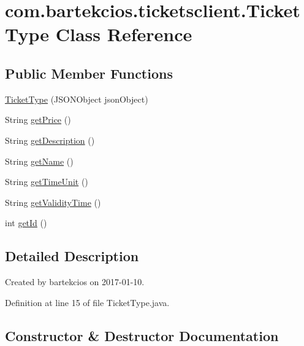 \hypertarget{classcom_1_1bartekcios_1_1ticketsclient_1_1_ticket_type}{}\section{com.\+bartekcios.\+ticketsclient.\+Ticket\+Type Class Reference}
\label{classcom_1_1bartekcios_1_1ticketsclient_1_1_ticket_type}
\subsection*{Public Member Functions}
\begin{DoxyCompactItemize}
\item 
\hyperlink{classcom_1_1bartekcios_1_1ticketsclient_1_1_ticket_type_a2f2c298fa4a10f862d9d1c70f1286391}{Ticket\+Type} (J\+S\+O\+N\+Object json\+Object)
\item 
String \hyperlink{classcom_1_1bartekcios_1_1ticketsclient_1_1_ticket_type_a2fe11180a5868b251b88b0badb659aa6}{get\+Price} ()
\item 
String \hyperlink{classcom_1_1bartekcios_1_1ticketsclient_1_1_ticket_type_adc76e446d302f4d340295faa53d8ba7c}{get\+Description} ()
\item 
String \hyperlink{classcom_1_1bartekcios_1_1ticketsclient_1_1_ticket_type_abee6730aaaab5cf5484da77a1d3528e6}{get\+Name} ()
\item 
String \hyperlink{classcom_1_1bartekcios_1_1ticketsclient_1_1_ticket_type_abbbf7278bf388e396a8a311a792d2623}{get\+Time\+Unit} ()
\item 
String \hyperlink{classcom_1_1bartekcios_1_1ticketsclient_1_1_ticket_type_a712481d3139fdcc756bc6e78b3e79414}{get\+Validity\+Time} ()
\item 
int \hyperlink{classcom_1_1bartekcios_1_1ticketsclient_1_1_ticket_type_aaa8228d150ee64f6d06b6e9523f94696}{get\+Id} ()
\end{DoxyCompactItemize}


\subsection{Detailed Description}
Created by bartekcios on 2017-\/01-\/10. 

Definition at line 15 of file Ticket\+Type.\+java.



\subsection{Constructor \& Destructor Documentation}
\mbox{\label{classcom_1_1bartekcios_1_1ticketsclient_1_1_ticket_type_a2f2c298fa4a10f862d9d1c70f1286391}} 
